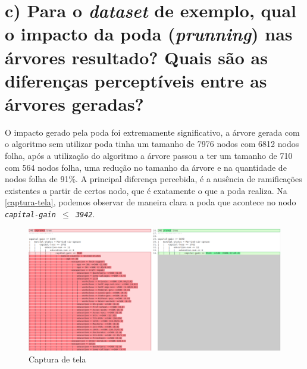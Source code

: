 \documentclass[
    article,            %
    11pt,               %
    oneside,            %
    a4paper,            %
    english,            %
    brazil,             %
    sumario=tradicional,
    ]{abntex2}
\begin{document}
\section*{\textbf{c) Para o \textit{dataset} de exemplo, qual o impacto da poda (\textit{prunning}) nas árvores resultado? Quais são as diferenças perceptíveis entre as árvores geradas?}}

O impacto gerado pela poda foi extremamente significativo, a árvore gerada com o algoritmo sem utilizar poda tinha um tamanho de 7976 nodos com 6812 nodos folha, após a utilização do algoritmo a árvore passou a ter um tamanho de 710 com 564 nodos folha, uma redução no tamanho da árvore e na quantidade de nodos folha de 91\%. A principal diferença percebida, é a ausência de ramificações existentes a partir de certos nodo, que é exatamente o que a poda realiza. Na \autoref{captura-tela}, podemos observar de maneira clara a poda que acontece no nodo \texttt{\textit{capital-gain $\le$ 3942}}.

\begin{figure}[H]
    \caption{Captura de tela}
    \label{captura-tela}
    \centering
    \includegraphics[width=\textwidth]{imgs/unpruned-vs-pruned.pdf}
\end{figure}


% 


\postextual

\newpage
\nocite{material_aula}
\nocite{enunciado_aula}
\nocite{Witten:2016:DMF:3086818}

\end{document}
